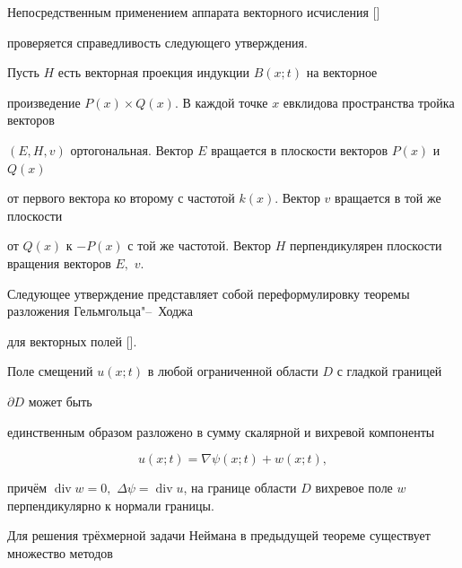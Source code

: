 Непосредственным применением аппарата векторного исчисления [] 

проверяется справедливость следующего утверждения.



\smallskip



\begin{theorem}[1]Пусть $H$ есть векторная проекция индукции $B(x;t)$ на векторное

произведение $P(x)\times Q(x).$ В каждой точке $x$ евклидова пространства тройка векторов

$(E,H,v)$ ортогональная$.$ Вектор $E$ вращается в плоскости векторов $P(x)$ и $Q(x)$ 

от первого вектора ко второму с частотой $k(x).$ Вектор $v$ вращается в той же плоскости

от $Q(x)$ к $-P(x)$ с той же частотой$.$ Вектор $H$ перпендикулярен плоскости вращения векторов $E,$ $v.$

\end{theorem}



\smallskip



Следующее утверждение представляет собой переформулировку теоремы  разложения Гельмгольца"--~Ходжа 

для векторных полей [].



\smallskip



\begin{theorem}[2]Поле смещений $u(x;t)$  в любой ограниченной области $D$ с гладкой границей

$\partial D$ может быть

единственным образом разложено в сумму скалярной и вихревой компоненты

$$

u(x;t) = \nabla\psi(x;t) + w(x;t),

$$

причём $\mathop{\mathrm{div}} w = 0,$  $\Delta\psi = \mathop{\mathrm{div}}  u$, на границе области $D$ вихревое поле $w$ перпендикулярно к нормали границы.

\end{theorem}



\smallskip



Для решения трёхмерной задачи Неймана в предыдущей теореме существует множество методов 


